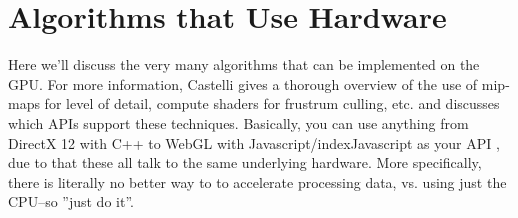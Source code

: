 \section{Algorithms that Use Hardware}
Here we'll discuss the very many algorithms that can be implemented on the GPU. For more information, Castelli
\cite{Castelli2018} gives a thorough overview of the use of mip-maps for level of detail, compute shaders for
frustrum culling, etc. and discusses which APIs support these techniques. Basically, you can use anything from
DirectX 12 with C++ to WebGL with Javascript/index{Javascript} as your API ,
due to that these all talk to the same underlying hardware. More specifically, there is literally no better way to
to accelerate processing data, vs. using just the CPU--so ''just do it''.